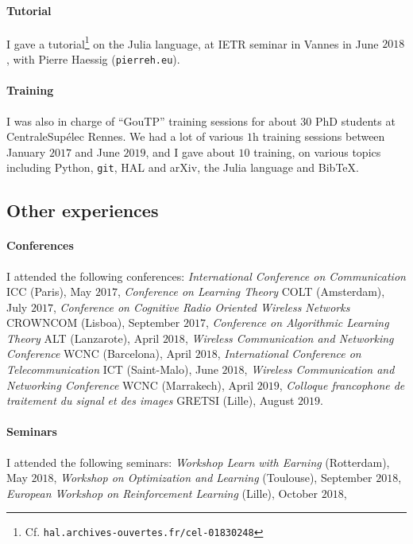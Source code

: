 \paragraph{Tutorial}
    I gave a tutorial\footnote{Cf. \texttt{hal.archives-ouvertes.fr/cel-01830248}} on the Julia language, at IETR seminar in Vannes in June $2018$,
    with Pierre Haessig (\texttt{pierreh.eu}).

\paragraph{Training}
    I was also in charge of ``GouTP'' training sessions for about $30$ PhD students at CentraleSupélec Rennes.
    We had a lot of various $1$h training sessions between January $2017$ and June $2019$,
    and I gave about $10$ training, on various topics including Python, \texttt{git}, HAL and arXiv, the Julia language and Bib\TeX{}.


\subsection{Other experiences}

\paragraph{Conferences} I attended the following conferences:
	\emph{International Conference on Communication} ICC (Paris), May $2017$,
    \emph{Conference on Learning Theory} COLT (Amsterdam), July $2017$,
    \emph{Conference on Cognitive Radio Oriented Wireless Networks} CROWNCOM (Lisboa), September $2017$,
    \emph{Conference on Algorithmic Learning Theory} ALT (Lanzarote), April $2018$,
    \emph{Wireless Communication and Networking Conference} WCNC (Barcelona), April $2018$,
	\emph{International Conference on Telecommunication} ICT (Saint-Malo), June $2018$,
    \emph{Wireless Communication and Networking Conference} WCNC (Marrakech), April $2019$,
    \emph{Colloque francophone de traitement du signal et des images} GRETSI (Lille), August $2019$.

\paragraph{Seminars} I attended the following seminars:
	\emph{Workshop Learn with Earning} (Rotterdam), May $2018$,
	\emph{Workshop on Optimization and Learning} (Toulouse), September $2018$,
	\emph{European Workshop on Reinforcement Learning} (Lille), October $2018$,

